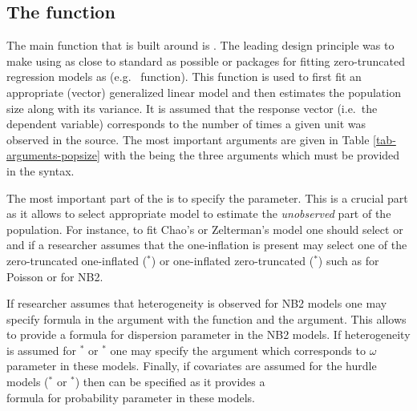 \documentclass[
]{jss}
\newcommand{\1}{\mathcal{I}} \newcommand{\bZero}{\boldsymbol{0}}
\begin{document}
\subsection[The estimatePopsize function]{The  function}

The main function that  is built around is
. The leading design principle was to make using
 as close to standard  as
possible or packages for fitting zero-truncated regression models as
 (e.g.~ function). This
function is used to first fit an appropriate (vector) generalized linear
model and then estimates the population size along with its variance. It
is assumed that the response vector (i.e.~the dependent variable)
corresponds to the number of times a given unit was observed in the
source. The most important arguments are given in Table
\ref{tab-arguments-popsize} with the  being
the three arguments which must be provided in the 
syntax.

The most important part of the  is to specify the
 parameter. This is a crucial part as it allows to select
appropriate model to estimate the \emph{unobserved} part of the
population. For instance, to fit Chao's or Zelterman's model one should
select  or  and if a researcher assumes that
the one-inflation is present may select one of the zero-truncated
one-inflated (\(^\ast\)) or one-inflated zero-truncated
(\(^\ast\)) such as  for Poisson or
 for NB2.

If researcher assumes that heterogeneity is observed for NB2 models one
may specify formula in the  argument with the
 function and the  argument. This
allows to provide a formula for dispersion parameter in the NB2 models.
If heterogeneity is assumed for \(^\ast\) or
\(^\ast\) one may specify the  argument
which corresponds to \(\omega\) parameter in these models. Finally, if
covariates are assumed for the hurdle models (\(^\ast\)
or \(^\ast\)) then  can be specified as
it provides a\\
formula for probability parameter in these models.
\end{document}
